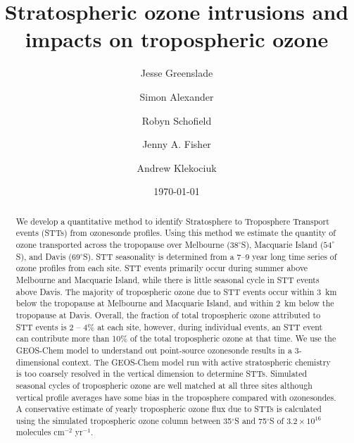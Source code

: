 \documentclass{article}
\begin{document}
\title{Stratospheric ozone intrusions and impacts on tropospheric ozone}

\author[1]{Jesse Greenslade}
\author[2]{Simon Alexander}
\author[3,4]{Robyn Schofield}
\author[1,5]{Jenny A. Fisher}
\author[2]{Andrew Klekociuk}


\date{\today}



\maketitle

\begin{abstract}
  We develop a quantitative method to identify Stratosphere to Troposphere Transport events (STTs) from ozonesonde profiles. 
  Using this method we estimate the quantity of ozone transported across the tropopause over Melbourne ($38^\circ$S), Macquarie Island ($54^\circ$S), and Davis ($69^\circ$S).
  STT seasonality is determined from a 7--9 year long time series of ozone profiles from each site.
  STT events primarily occur during summer above Melbourne and Macquarie Island, while there is little seasonal cycle in STT events above Davis.
  The majority of tropospheric ozone due to STT events occur within 3~km below the tropopause at Melbourne and Macquarie Island, and within 2~km below the tropopause at Davis.
  Overall, the fraction of total tropospheric ozone attributed to STT events is 2 – 4\% at each site, however, during individual events, an STT event can contribute more than 10\% of the total tropospheric ozone at that time.
  We use the GEOS-Chem model to understand out point-source ozonesonde results in a 3-dimensional context.
  The GEOS-Chem model run with active stratospheric chemistry is too coarsely resolved in the vertical dimension to determine STTs.
  Simulated seasonal cycles of tropospheric ozone are well matched at all three sites although vertical profile averages have some bias in the troposphere compared with ozonesondes.
  A conservative estimate of yearly tropospheric ozone flux due to STTs is calculated using the simulated tropospheric ozone column between 35$^\circ$S and  75$^\circ$S of $3.2\times10^{16}$ molecules cm$^{-2}$ yr$^{-1}$.
  
\end{abstract}%
\end{document}
